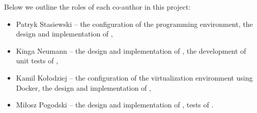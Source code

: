 \bigskip

\noindent Below we outline the roles of each co-author in this project:
\begin{itemize}
    \item Patryk Stasiewski -- the configuration of the \NVM programming environment, the design and implementation of \emph{\PersistentHashTable},
    \item Kinga Neumann -- the design and implementation of \emph{\PersistentHashTable}, the development of unit tests of \emph{\PersistentHashTable},
    \item Kamil Kołodziej -- the configuration of the virtualization environment using Docker, the design and implementation of \DHTS,
    \item Miłosz Pogodski -- the design and implementation of \DHTS, tests of \DHTS.
\end{itemize}
